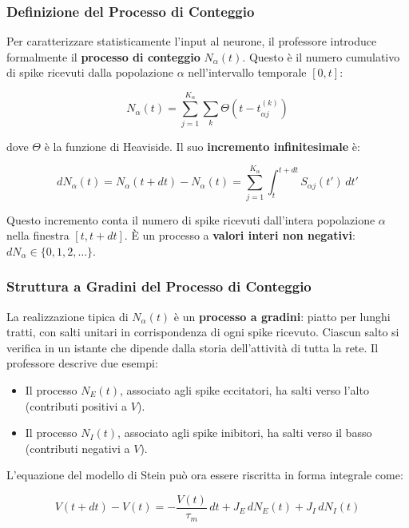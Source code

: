 \subsubsection{Definizione del Processo di Conteggio}

Per caratterizzare statisticamente l'input al neurone, il professore introduce formalmente il \textbf{processo di conteggio} $N_\alpha(t)$. Questo è il numero cumulativo di spike ricevuti dalla popolazione $\alpha$ nell'intervallo temporale $[0, t]$:

\begin{equation}
N_\alpha(t) = \sum_{j=1}^{K_\alpha} \sum_k \Theta(t - t_{\alpha j}^{(k)})
\end{equation}

dove $\Theta$ è la funzione di Heaviside. Il suo \textbf{incremento infinitesimale} è:

\begin{equation}
dN_\alpha(t) = N_\alpha(t + dt) - N_\alpha(t) = \sum_{j=1}^{K_\alpha} \int_t^{t+dt} S_{\alpha j}(t')\, dt'
\end{equation}

Questo incremento conta il numero di spike ricevuti dall'intera popolazione $\alpha$ nella finestra $[t, t+dt]$. È un processo a \textbf{valori interi non negativi}: $dN_\alpha \in \{0, 1, 2, \ldots\}$.

\subsubsection{Struttura a Gradini del Processo di Conteggio}

La realizzazione tipica di $N_\alpha(t)$ è un \textbf{processo a gradini}: piatto per lunghi tratti, con salti unitari in corrispondenza di ogni spike ricevuto. Ciascun salto si verifica in un istante che dipende dalla storia dell'attività di tutta la rete. Il professore descrive due esempi:

\begin{itemize}
    \item Il processo $N_E(t)$, associato agli spike eccitatori, ha salti verso l'alto (contributi positivi a $V$).
    \item Il processo $N_I(t)$, associato agli spike inibitori, ha salti verso il basso (contributi negativi a $V$).
\end{itemize}

L'equazione del modello di Stein può ora essere riscritta in forma integrale come:

\begin{equation}
V(t + dt) - V(t) = -\frac{V(t)}{\tau_m}\, dt + J_E\, dN_E(t) + J_I\, dN_I(t)
\end{equation}


